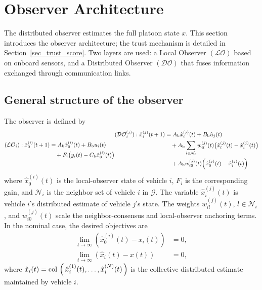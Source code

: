 \documentclass{ifacconf}
\def\col#1{\mathop{{\rm col}\,\left(\,#1\,\right)}}
\def\G{\mathcal{G}} %
\def\N{\mathcal{N}} %
\def\LO{\mathcal{LO}} %
\def\DO{\mathcal{DO}} %
\begin{document}
\section{Observer Architecture}\label{sec_Distributed Observer}
The distributed observer estimates the full platoon state $x$. This section introduces the observer architecture; the trust mechanism is detailed in Section~\ref{sec_trust_score}. Two layers are used: a Local Observer $(\LO)$ based on onboard sensors, and a Distributed Observer $(\DO)$ that fuses information exchanged through communication links.

\subsection{General structure of the observer}
\vspace*{-0.2cm}
The observer is defined by
\begin{subequations}\label{eq_observer}
\begin{small}
\begin{align}\label{eq_LO}
(\LO_i): \hat{x}_{0}^{(i)}(t+1)
&= A_{\text{b}} \hat{x}_{0}^{(i)}(t) + B_{\text{b}} u_i(t)\notag \\
&\quad + F_i\big(y_i(t) - C_{\text{b}} \hat{x}_{0}^{(i)}(t)\big) %
\end{align}
\begin{align}\label{eq_DO}
(\DO_i^{(j)}): \hat{x}^{(j)}_i(t+1)
&= A_{\text{b}} \hat{x}_i^{(j)}(t) + B_{\text{b}} \hat{u}_j(t) \notag\\
&\quad+ A_{\text{b}}\sum_{l \in \N_i} w_{il}^{(j)}(t)
   \big(\hat{x}_l^{(j)}(t)-\hat{x}_i^{(j)}(t)\big)  \notag\\
&\quad + A_{\text{b}} w_{i 0}^{(j)}(t)
   \Big(\hat{x}_0^{(j)}(t)-\hat{x}_i^{(j)}(t)\Big) %
\end{align}
\end{small}
\end{subequations}
where $\hat{x}_{0}^{(i)}(t)$ is the local-observer state of vehicle $i$, $F_i$ is the corresponding gain, and $\N_i$ is the neighbor set of vehicle $i$ in $\G$. The variable $\hat{x}_i^{(j)}(t)$ is vehicle $i$'s distributed estimate of vehicle $j$'s state. The weights $w_{il}^{(j)}(t)$, $l \in \N_i$, and $w_{i0}^{(j)}(t)$ scale the neighbor-consensus and local-observer anchoring terms. In the nominal case, the desired objectives are
\begin{align}
    \lim_{t \rightarrow \infty} \left( \hat{x}_{0}^{(i)}(t) - x_i(t) \right) &= 0,
    \label{eq_hatx_0}\\
    \lim_{t \rightarrow \infty} \left( \hat{x}_i(t) - x(t) \right) &= 0,
    \label{eq_hatx_i}
\end{align}
where $\hat{x}_i(t) = \col{\hat{x}^{(1)}_i(t), \ldots, \hat{x}^{(N)}_i(t)}$ is the collective distributed estimate maintained by vehicle $i$.
\end{document}
